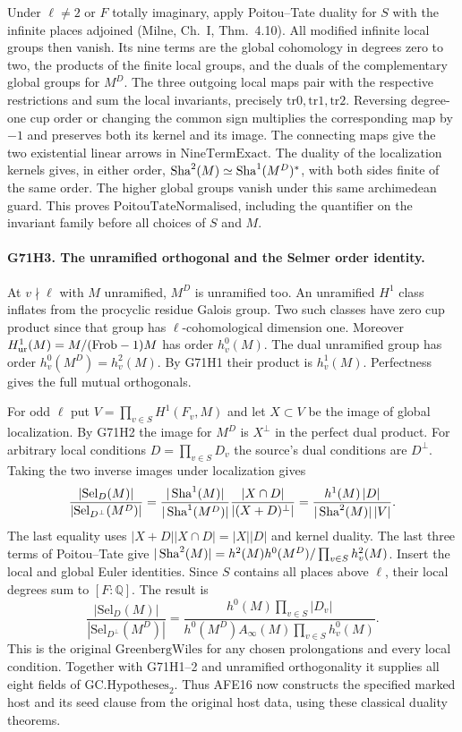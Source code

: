 Under $\ell\ne2$ or $F$ totally imaginary, apply Poitou--Tate
duality for $S$ with the infinite places adjoined (Milne,
Ch.~I, Thm.~4.10). All modified infinite local groups then
vanish. Its nine terms are the global cohomology in degrees
zero to two, the products of the finite local groups, and the
duals of the complementary global groups for $M^D$. The three
outgoing local maps pair with the respective restrictions and
sum the local invariants, precisely $\mathrm{tr0},\mathrm{tr1},
\mathrm{tr2}$. Reversing degree-one cup order or changing the
common sign multiplies the corresponding map by $-1$ and
preserves both its kernel and its image. The connecting maps
give the two existential linear arrows in $\mathrm{NineTermExact}$.
The duality of the localization kernels gives, in either order,
$\mathop{\mathrm{Sha}}^2(M)\simeq\mathop{\mathrm{Sha}}^1(M^D)^*$, with both sides finite of the
same order. The higher global groups vanish under this same
archimedean guard. This proves $\mathrm{PoitouTateNormalised}$,
including the quantifier on the invariant family before all
choices of $S$ and $M$.

\paragraph{G71H3. The unramified orthogonal and the Selmer order identity.}
At $v\nmid\ell$ with $M$ unramified, $M^D$ is unramified too.
An unramified $H^1$ class inflates from the procyclic residue
Galois group. Two such classes have zero cup product since
that group has $\ell$-cohomological dimension one.
Moreover $H^1_{\rm ur}(M)=M/(\mathrm{Frob}-1)M$ has order
$h_v^0(M)$. The dual unramified group has order
$h_v^0(M^D)=h_v^2(M)$. By G71H1 their product is $h_v^1(M)$.
Perfectness gives the full mutual orthogonals.

For odd $\ell$ put $V=\prod_{v\in S}H^1(F_v,M)$ and let
$X\subset V$ be the image of global localization. By G71H2 the
image for $M^D$ is $X^\perp$ in the perfect dual product. For
arbitrary local conditions $D=\prod_{v\in S}D_v$ the source's
dual conditions are $D^\perp$. Taking the two inverse images
under localization gives
\[
 \frac{|\mathrm{Sel}_D(M)|}{|\mathrm{Sel}_{D^\perp}(M^D)|}
 =
 \frac{|\mathop{\mathrm{Sha}}^1(M)|}{|\mathop{\mathrm{Sha}}^1(M^D)|}
 \frac{|X\cap D|}{|(X+D)^\perp|}
 =
 \frac{h^1(M)\,|D|}{|\mathop{\mathrm{Sha}}^2(M)|\,|V|}.
\]
The last equality uses $|X+D||X\cap D|=|X||D|$ and kernel
duality. The last three terms of Poitou--Tate give
$|\mathop{\mathrm{Sha}}^2(M)|=h^2(M)h^0(M^D)/\prod_{v\in S}h_v^2(M)$.
Insert the local and global Euler identities. Since $S$ contains
all places above $\ell$, their local degrees sum to
$[F:\mathbb Q]$. The result is
\[
 \frac{|\mathrm{Sel}_D(M)|}{|\mathrm{Sel}_{D^\perp}(M^D)|}
 =\frac{h^0(M)\prod_{v\in S}|D_v|}
 {h^0(M^D)A_\infty(M)\prod_{v\in S}h_v^0(M)}.
\]
This is the original $\mathrm{GreenbergWiles}$ for any chosen
prolongations and every local condition. Together with G71H1--2
and unramified orthogonality it supplies all eight fields of
$\mathrm{GC.Hypotheses}_2$. Thus AFE16 now constructs the
specified marked host and its seed clause from the original host
data, using these classical duality theorems.

